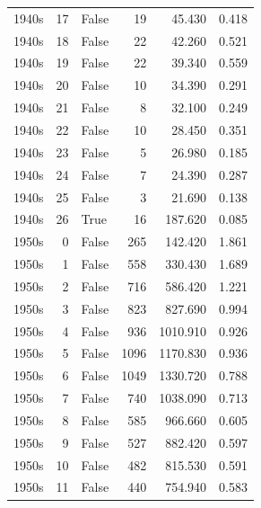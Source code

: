 \begin{table}
\begin{tabular}{lrlrrr}
      1940s &   17 &             False &         19 &        45.430 &     0.418 \\
      1940s &   18 &             False &         22 &        42.260 &     0.521 \\
      1940s &   19 &             False &         22 &        39.340 &     0.559 \\
      1940s &   20 &             False &         10 &        34.390 &     0.291 \\
      1940s &   21 &             False &          8 &        32.100 &     0.249 \\
      1940s &   22 &             False &         10 &        28.450 &     0.351 \\
      1940s &   23 &             False &          5 &        26.980 &     0.185 \\
      1940s &   24 &             False &          7 &        24.390 &     0.287 \\
      1940s &   25 &             False &          3 &        21.690 &     0.138 \\
      1940s &   26 &              True &         16 &       187.620 &     0.085 \\
      1950s &    0 &             False &        265 &       142.420 &     1.861 \\
      1950s &    1 &             False &        558 &       330.430 &     1.689 \\
      1950s &    2 &             False &        716 &       586.420 &     1.221 \\
      1950s &    3 &             False &        823 &       827.690 &     0.994 \\
      1950s &    4 &             False &        936 &      1010.910 &     0.926 \\
      1950s &    5 &             False &       1096 &      1170.830 &     0.936 \\
      1950s &    6 &             False &       1049 &      1330.720 &     0.788 \\
      1950s &    7 &             False &        740 &      1038.090 &     0.713 \\
      1950s &    8 &             False &        585 &       966.660 &     0.605 \\
      1950s &    9 &             False &        527 &       882.420 &     0.597 \\
      1950s &   10 &             False &        482 &       815.530 &     0.591 \\
      1950s &   11 &             False &        440 &       754.940 &     0.583 \\

\end{tabular}
\end{table}
